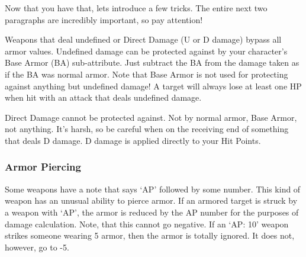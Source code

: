 \documentclass[twoside]{book}
\begin{document}
  
    {  
     Now that you have that, lets introduce a few tricks.
               The entire next two paragraphs are incredibly important,
               so pay attention! 
    }
  
    {  
     Weapons that deal undefined or Direct Damage (U or D
               damage) bypass all armor values. Undefined damage can be
               protected against by your character's Base Armor
               (BA) sub-attribute. Just subtract the BA from the damage
               taken as if the BA was normal armor. Note that Base Armor
               is not used for protecting against anything but undefined
               damage! A target will always lose at least one HP when hit
               with an attack that deals undefined damage. 
    }
  
    {  
     Direct Damage cannot be protected against. Not by
               normal armor, Base Armor, not anything. It's harsh,
               so be careful when on the receiving end of something that
               deals D damage. D damage is applied directly to your Hit
               Points. 
    }
  
    

\subsubsection{Armor Piercing}
    
    {  
     Some weapons have a note that says
                 `AP' followed by some number. This kind of
                 weapon has an unusual ability to pierce armor. If an
                 armored target is struck by a weapon with
                 `AP', the armor is reduced by the AP number
                 for the purposes of damage calculation. Note, that this
                 cannot go negative. If an `AP: 10' weapon
                 strikes someone wearing 5 armor, then the armor is
                 totally ignored. It does not, however, go to -5. 
    }
  
  

  
\end{document}
